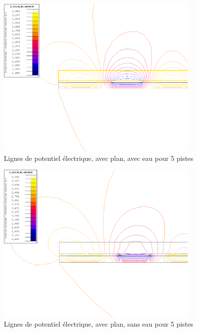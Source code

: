 \begin{figure}[!ht]
 \centering
 \includegraphics[width=10cm]{C5airMasseligne.png}
 \caption{Lignes de potentiel électrique, avec plan, avec eau pour 5 pistes}
 \label{c5planlair}
\end{figure}

\begin{figure}[!ht]
 \centering
 \includegraphics[width=10cm]{C5eauMasseligne.png}
 \caption{Lignes de potentiel électrique, avec plan, sans eau pour 5 pistes}
 \label{c5planleau}
\end{figure}

\newpage

